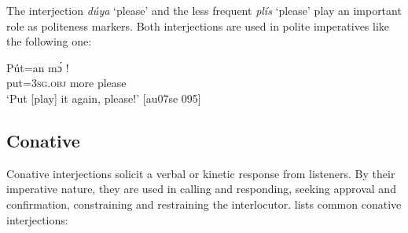 The interjection \textit{dúya} ‘please’ and the less frequent \textit{plís} ‘please’ play an important role as politeness markers. Both interjections are used in polite imperatives like the following one: 


\ea%
    \label{ex:key:1651}
    \gll Pút=an    mɔ́    !\\
put=3\textsc{sg.obj}  more  please\\

\glt ‘Put [play] it again, please!’ [au07se 095]
\z

\subsection{Conative}\label{sec:12.2.3}

Conative interjections solicit a verbal or kinetic response from listeners. By their imperative nature, they are used in calling and responding, seeking approval and confirmation, constraining and restraining the interlocutor.  lists common conative interjections: 

